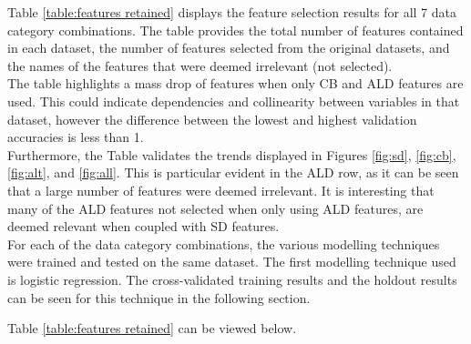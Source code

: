 Table \ref{table:features retained} displays the feature selection results for all 7 data category combinations. The table provides the total number of features contained in each dataset, the number of features selected from the original datasets, and the names of the features that were deemed irrelevant (not selected). \\

The table highlights a mass drop of features when only CB and ALD features are used. This could indicate dependencies and collinearity between variables in that dataset, however the difference between the lowest and highest validation accuracies is less than 1.  \\

Furthermore, the Table validates the trends displayed in Figures \ref{fig:sd}, \ref{fig:cb}, \ref{fig:alt}, and \ref{fig:all}. This is particular evident in the ALD row, as it can be seen that a large number of features were deemed irrelevant. It is interesting that many of the ALD features not selected when only using ALD features, are deemed relevant when coupled with SD features.  \\

For each of the data category combinations, the various modelling techniques were trained and tested on the same dataset. The first modelling technique used is logistic regression. The cross-validated training results and the holdout results can be seen for this technique in the following section. \newpage


Table \ref{table:features retained} can be viewed below. 

\vspace{10pt}

